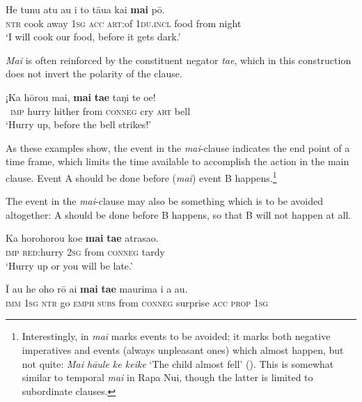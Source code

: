 \ea\label{ex:11.204}
\gll He tunu atu au i to tāua kai \textbf{mai} pō. \\
\textsc{ntr} cook away \textsc{1sg} \textsc{acc} \textsc{art}:of \textsc{1du.incl} food from night \\

\glt
‘I will cook our food, before it gets dark.’ \textstyleExampleref{[R229.140]} 
\z

\textit{Mai} is often reinforced by the constituent negator \textit{ta{\ꞌ}e}, which in this construction does not invert the polarity of the clause.

\ea\label{ex:11.205}
\gll ¡Ka hōrou mai, \textbf{mai} \textbf{ta{\ꞌ}e} taŋi te oe!\\
~\textsc{imp} hurry hither from \textsc{conneg} cry \textsc{art} bell\\

\glt
‘Hurry up, before the bell strikes!’ \textstyleExampleref{[R334.077]} 
\z

As these examples show, the event in the \textit{mai}{}-clause indicates the end point of a time frame, which limits the time available to accomplish the action in the main clause. Event A should be done before (\textit{mai}) event B happens.\footnote{\label{fn:528}Interestingly, in  \textit{mai} marks events to be avoided; it marks both negative imperatives and events (always unpleasant ones) which almost happen, but not quite: \textit{Mai hā{\ꞌ}ule ke keike} ‘The child almost fell’ (\citealt[61–63]{ElbertPukui1979}). This is somewhat similar to temporal \textit{mai} in Rapa Nui, though the latter is limited to subordinate clauses.} 

The event in the \textit{mai}{}-clause may also be something which is to be avoided altogether: A should be done before B happens, so that B will not happen at all.

\ea\label{ex:11.206}
\gll Ka horohorou koe \textbf{mai} \textbf{ta{\ꞌ}e} {\ꞌ}atrasao. \\
\textsc{imp} \textsc{red}:hurry \textsc{2sg} from \textsc{conneg} tardy \\

\glt 
‘Hurry up or you will be late.’ \textstyleExampleref{[R245.019]} 
\z

\ea\label{ex:11.207}
\gll {\ꞌ}Ī au he oho rō {\ꞌ}ai \textbf{mai} \textbf{ta{\ꞌ}e} ma{\ꞌ}urima i a au. \\
\textsc{imm} \textsc{1sg} \textsc{ntr} go \textsc{emph} \textsc{subs} from \textsc{conneg} surprise \textsc{acc} \textsc{prop} \textsc{1sg} \\

